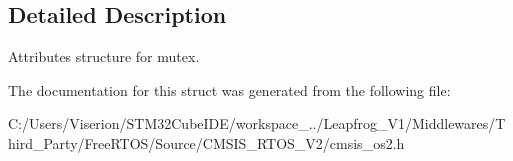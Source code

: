 \subsection{Detailed Description}
Attributes structure for mutex. 

The documentation for this struct was generated from the following file\+:\begin{DoxyCompactItemize}
\item 
C\+:/\+Users/\+Viserion/\+S\+T\+M32\+Cube\+I\+D\+E/workspace\+\_../\+Leapfrog\+\_\+\+V1/\+Middlewares/\+Third\+\_\+\+Party/\+Free\+R\+T\+O\+S/\+Source/\+C\+M\+S\+I\+S\+\_\+\+R\+T\+O\+S\+\_\+\+V2/cmsis\+\_\+os2.\+h\end{DoxyCompactItemize}
